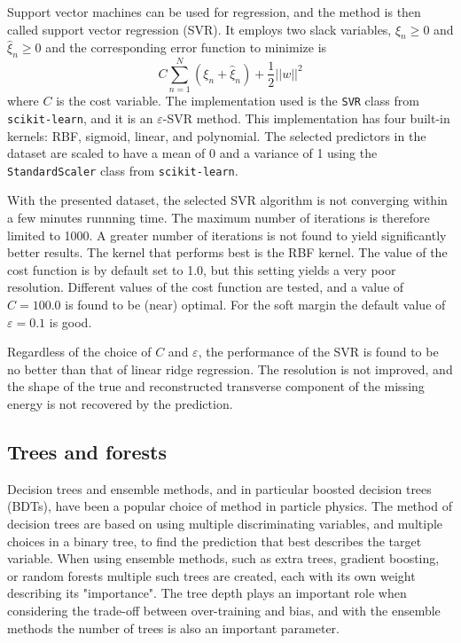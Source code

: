 \documentclass{scrartcl}
\begin{document}
Support vector machines can be used for regression, and the method is then called support vector regression (SVR). It employs two slack variables, $ξ_n ≥ 0$ and $\hat{ξ}_n ≥ 0$ and the corresponding error function to minimize is
\[
  C \sum_{n=1}^N(ξ_n + \hat{ξ}_n) + \frac{1}{2}||w||^2
\]
where $C$ is the cost variable. The implementation used is the \texttt{SVR} class from \texttt{scikit-learn}, and it is an $ε$-SVR method. This implementation has four built-in kernels: RBF, sigmoid, linear, and polynomial. The selected predictors in the dataset are scaled to have a mean of 0 and a variance of 1 using the \texttt{StandardScaler} class from \texttt{scikit-learn}.

With the presented dataset, the selected SVR algorithm is not converging within a few minutes runnning time. The maximum number of iterations is therefore limited to 1000. A greater number of iterations is not found to yield significantly better results. The kernel that performs best is the RBF kernel. The value of the cost function is by default set to 1.0, but this setting yields a very poor resolution. Different values of the cost function are tested, and a value of $C=100.0$ is found to be (near) optimal. For the soft margin the default value of $ε=0.1$ is good.

Regardless of the choice of $C$ and $ε$, the performance of the SVR is found to be no better than that of linear ridge regression. The resolution is not improved, and the shape of the true and reconstructed transverse component of the missing energy is not recovered by the prediction.

\subsection{Trees and forests}

Decision trees and ensemble methods, and in particular boosted decision trees (BDTs), have been a popular choice of method in particle physics. The method of decision trees are based on using multiple discriminating variables, and multiple choices in a binary tree, to find the prediction that best describes the target variable. When using ensemble methods, such as extra trees, gradient boosting, or random forests multiple such trees are created, each with its own weight describing its "importance". The tree depth plays an important role when considering the trade-off between over-training and bias, and with the ensemble methods the number of trees is also an important parameter.
\end{document}
